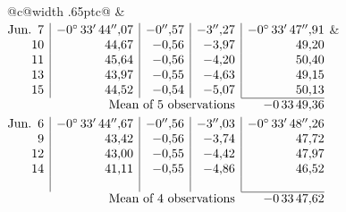 \noindent\begin{tabular}{@{}c@{\hspace{.4em}\vrule width .65pt\hspace{.4em}}c@{}}
 &
 \\[.18ex]
\(\begin{array}[t]{@{}r|r|r|r|r@{}}
\text{Jun.}\enspace 7 & -0^\circ\,33'\,44''{,}07 & -0''{,}57 & -3''{,}27 & -0^\circ\,33'\,47''{,}91\\
10 & 44{,}67 & -0{,}56 & -3{,}97 & 49{,}20\\
11 & 45{,}64 & -0{,}56 & -4{,}20 & 50{,}40\\
13 & 43{,}97 & -0{,}55 & -4{,}63 & 49{,}15\\
15 & 44{,}52 & -0{,}54 & -5{,}07 & 50{,}13\\
\cline{5-5}
\multicolumn{4}{r}{\text{Mean of 5 observations}} & -0\,33\,49{,}36
\end{array}\)
&
\(\begin{array}[t]{@{}r|r|r|r|r@{}}
\text{Jun.}\enspace 6 & -0^\circ\,33'\,44''{,}67 & -0''{,}56 & -3''{,}03 & -0^\circ\,33'\,48''{,}26\\
9 & 43{,}42 & -0{,}56 & -3{,}74 & 47{,}72\\
12 & 43{,}00 & -0{,}55 & -4{,}42 & 47{,}97\\
14 & 41{,}11 & -0{,}55 & -4{,}86 & 46{,}52\\
 & & & & \\
\cline{5-5}
\multicolumn{4}{r}{\text{Mean of 4 observations}} & -0\,33\,47{,}62
\end{array}\)
\end{tabular}\par\medskip
{}
